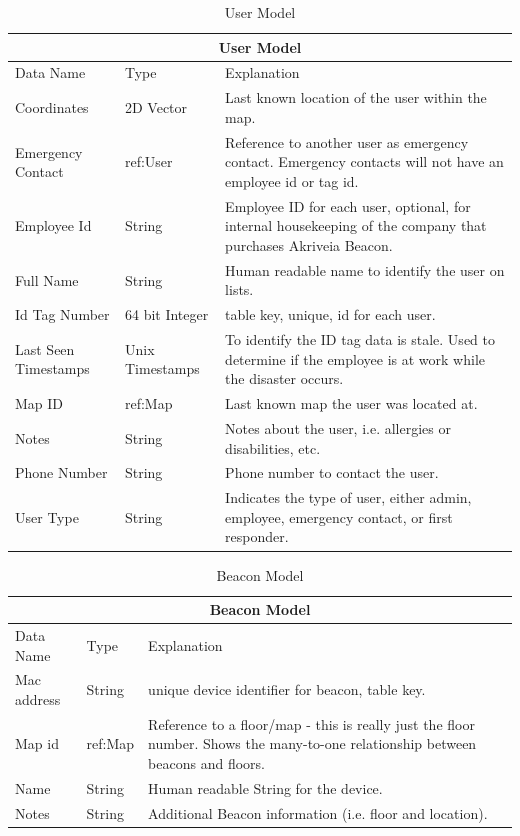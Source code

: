 \begin{table}[H]
\centering
\begin{tabular}{| m{3cm} | m{3cm} | m{9.5cm} |}
	\hline
	\multicolumn{3}{|c|}{User Model} \\
	\hline
	Data Name & Type & Explanation \\

	\hline
	Coordinates & 2D Vector & Last known location of the user within the map. \\
	\hline
	Emergency Contact & ref:User & Reference to another user as emergency contact. Emergency contacts will not have an employee id or tag id. \\
	\hline
	Employee Id & String & Employee ID for each user, optional, for internal housekeeping of the company that purchases Akriveia Beacon. \\
	\hline
	Full Name & String & Human readable name to identify the user on lists. \\
	\hline
	Id Tag Number & 64 bit Integer & table key, unique, id for each user. \\
	\hline
	Last Seen Timestamps & Unix Timestamps & To identify the ID tag data is stale. Used to determine if the employee is at work while the disaster occurs. \\
	\hline
	Map ID & ref:Map & Last known map the user was located at. \\
	\hline
	Notes & String & Notes about the user, i.e. allergies or disabilities, etc. \\
	\hline
	Phone Number & String & Phone number to contact the user. \\
	\hline
	User Type & String & Indicates the type of user, either admin, employee, emergency contact, or first responder. \\
	\hline
\end{tabular}
\caption{User Model}
\label{user_model}
\end{table}

\begin{table}[H]
\centering
\begin{tabular}{ | m{3cm} | m{3cm} | m{9.5cm} |}
	\hline
	\multicolumn{3}{|c|}{Beacon Model} \\
	\hline
	Data Name & Type & Explanation \\

	\hline
	Mac address & String & unique device identifier for beacon, table key.\\
	\hline
	Map id & ref:Map & Reference to a floor/map - this is really just the floor number. Shows the many-to-one relationship between beacons and floors. \\
	\hline
	Name & String & Human readable String for the device. \\
	\hline
	Notes & String & Additional Beacon information (i.e. floor and location). \\
	\hline
\end{tabular}
\caption{Beacon Model}
\label{beacon_model}
\end{table}

